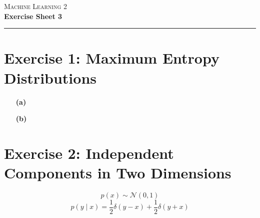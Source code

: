 \documentclass{article}
\newcommand{\prob}[1]{p\!\left(#1\right)}
\newcommand{\cprob}[2]{p\left(#1 \mid #2\right)}
\newcommand{\N}{\mathcal{N}}
\begin{document}
\begin{center}
	\Huge \textsc{Machine Learning 2} \\
    \Large \textbf{Exercise Sheet 3}
\end{center}

\hrule

\section*{Exercise 1: Maximum Entropy Distributions} 
\begin{itemize}
\item[\textbf{(a)}]
\item[\textbf{(b)}]
\end{itemize}

\section*{Exercise 2: Independent Components in Two Dimensions} 
\[ \prob{x} \sim \N(0,1) \]
\[ \cprob{y}{x} = \frac{1}{2} \delta(y-x) + \frac{1}{2} \delta(y+x) \]
\end{document}
